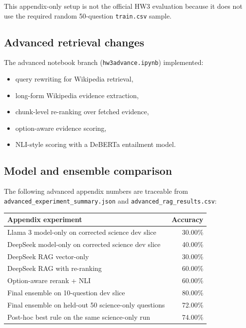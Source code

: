 \documentclass[12pt,a4paper]{article}
\begin{document}
This appendix-only setup is not the official HW3 evaluation because it does not use the required random 50-question \texttt{train.csv} sample.

\subsection{Advanced retrieval changes}

The advanced notebook branch (\texttt{hw3advance.ipynb}) implemented:

\begin{itemize}
    \item query rewriting for Wikipedia retrieval,
    \item long-form Wikipedia evidence extraction,
    \item chunk-level re-ranking over fetched evidence,
    \item option-aware evidence scoring,
    \item NLI-style scoring with a DeBERTa entailment model.
\end{itemize}

\subsection{Model and ensemble comparison}

The following advanced appendix numbers are traceable from \texttt{advanced\_experiment\_summary.json} and \texttt{advanced\_rag\_results.csv}:

\begin{table}[H]
\centering
\begin{tabular}{p{9cm}r}
\toprule
\textbf{Appendix experiment} & \textbf{Accuracy} \\
\midrule
Llama 3 model-only on corrected science dev slice & 30.00\% \\
DeepSeek model-only on corrected science dev slice & 40.00\% \\
DeepSeek RAG vector-only & 30.00\% \\
DeepSeek RAG with re-ranking & 60.00\% \\
Option-aware rerank + NLI & 60.00\% \\
Final ensemble on 10-question dev slice & 80.00\% \\
Final ensemble on held-out 50 science-only questions & 72.00\% \\
Post-hoc best rule on the same science-only run & 74.00\% \\
\bottomrule
\end{tabular}
\end{table}
\end{document}
